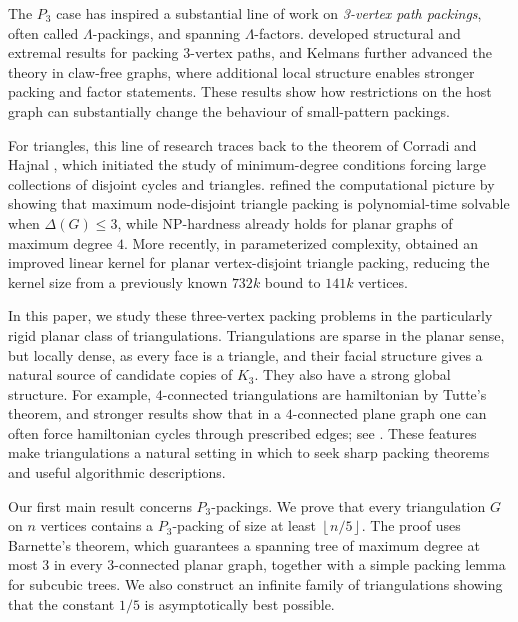 \documentclass{patmorin}
\newcommand{\defin}[1]{\emph{\textcolor{brightmaroon}{#1}}}
\begin{document}
The $P_3$ case has inspired a substantial line of work on \defin{3-vertex path packings}, often called $\Lambda$-packings, and spanning $\Lambda$-factors. \citet{p3} developed structural and extremal results for packing $3$-vertex paths, and Kelmans \cite{Kelmans2011} further advanced the theory in claw-free graphs, where additional local structure enables stronger packing and factor statements. These results show how restrictions on the host graph can substantially change the behaviour of small-pattern packings.

For triangles, this line of research traces back to the theorem of Corradi and Hajnal \cite{CorradiHajnal1963}, which initiated the study of minimum-degree conditions forcing large collections of disjoint cycles and triangles. \citet{CapraraRizzi2002} refined the computational picture by showing that maximum node-disjoint triangle packing is polynomial-time solvable when $\Delta(G)\le 3$, while NP-hardness already holds for planar graphs of maximum degree $4$. More recently, in parameterized complexity, \citet{ShengXiao2022} obtained an improved linear kernel for planar vertex-disjoint triangle packing, reducing the kernel size from a previously known $732k$ bound to $141k$ vertices.

In this paper, we study these three-vertex packing problems in the particularly rigid planar class of triangulations. Triangulations are sparse in the planar sense, but locally dense, as every face is a triangle, and their facial structure gives a natural source of candidate copies of $K_3$. 
They also have a strong global structure. 
For example, $4$-connected triangulations are hamiltonian by Tutte's theorem, and stronger results show that in a $4$-connected plane graph one can often force hamiltonian cycles through prescribed edges; see \cite{Whitney1932,Tutte1956,Sanders1996}. 
These features make triangulations a natural setting in which to seek sharp packing theorems and useful algorithmic descriptions.

Our first main result concerns $P_3$-packings. 
We prove that every triangulation $G$ on $n$ vertices contains a $P_3$-packing of size at least $\left\lfloor n/5\right\rfloor$.
The proof uses Barnette's theorem, which guarantees a spanning tree of maximum degree at most $3$ in every $3$-connected planar graph, together with a simple packing lemma for subcubic trees. 
We also construct an infinite family of triangulations showing that the constant $1/5$ is asymptotically best possible.
\end{document}
